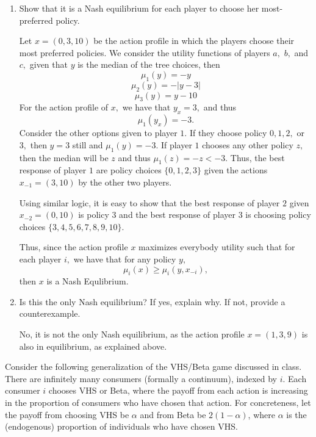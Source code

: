 \documentclass[11pt]{article}
\begin{document}
\begin{enumerate}
    \item 
    \begin{problem}
        Show that it is a Nash equilibrium for each player to choose her most-preferred
policy.
    \end{problem}
    \begin{solution}
    Let $x = (0,3,10)$ be the action profile in which the players choose their most preferred policies. We consider the utility functions of players $a,$ $b,$ and $c,$ given that $y$ is the median of the tree choices, then
        \[\mu_1(y) = -y\]
        \[\mu_2(y) = -|y-3|\]
        \[\mu_3(y) = y-10\]
    For the action profile of $x,$ we have that $y_x = 3,$ and thus 
    \[\mu_1(y_x) = -3.\] Consider the other options given to player $1.$ If they choose policy $0,1,2,$ or $3,$ then $y = 3$ still and $\mu_1(y) = -3$. If player $1$ chooses any other policy $z,$ then the median will be $z$ and thus $\mu_1(z) = -z < -3.$ Thus, the best response of player $1$ are policy choices $\{0,1,2,3\}$ given the actions $x_{-1} = (3,10)$ by the other two players.

    Using similar logic, it is easy to show that the best response of player $2$ given $x_{-2} = (0,10)$ is policy $3$ and the best response of player $3$ is choosing policy choices $\{3,4,5,6,7,8,9,10\}.$ 

    Thus, since the action profile $x$ maximizes everybody utility such that for each player $i,$ we have that for any policy $y,$
    \[\mu_i(x) \geq \mu_i(y, x_{-i}),\] then $x$ is a Nash Equlibrium.
    \end{solution}
    

\item 
\begin{problem}
    Is this the only Nash equilibrium? If yes, explain why. If not, provide a counterexample.
\end{problem}
\begin{solution}
    No, it is not the only Nash equilibrium, as the action profile $x = (1,3,9)$ is also in equilibrium, as explained above.
\end{solution}

\end{enumerate}
\newpage
\begin{problem}
    Consider the following generalization of the VHS/Beta game discussed in class. There are infinitely many consumers (formally a continuum), indexed by $i$. Each consumer $i$
chooses VHS or Beta, where the payoff from each action is increasing in the proportion of consumers who have chosen that action. For concreteness, let the payoff from choosing VHS be $\alpha$ and from Beta be $2(1-\alpha)$, where $\alpha$ is the (endogenous) proportion of individuals who have chosen VHS.
\end{problem}
\end{document}
